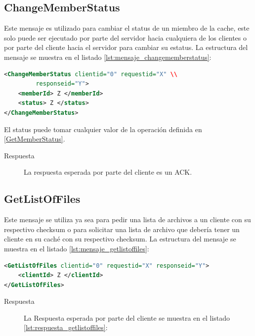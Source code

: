 \subsection{ChangeMemberStatus}
Este mensaje es utilizado para cambiar el status de un miembro de la cache, este solo puede ser ejecutado por parte del servidor hacia cualquiera de los clientes o  por parte del cliente hacia el servidor para cambiar su estatus. La estructura del mensaje se muestra en el listado \ref{lst:mensaje_changememberstatus}:

\begin{lstlisting}[language=XML,caption={Mensaje de ChangeMemberStatus},label={lst:mensaje_changememberstatus}]
<ChangeMemberStatus clientid="0" requestid="X" \\
		 responseid="Y"> 
	<memberId> Z </memberId>
	<status> Z </status>
</ChangeMemberStatus>
\end{lstlisting}


El status puede tomar cualquier valor de la operación definida en \ref{GetMemberStatus}. 


\begin{description}
\item[Respuesta] La respuesta esperada por parte del cliente es un ACK.
\end{description}

\subsection{GetListOfFiles}

Este mensaje se utiliza ya sea para pedir una lista de archivos a un cliente con su respectivo checksum o para solicitar una lista de archivo que debería tener un cliente en su caché con su respectivo checksum. La estructura del mensaje se muestra en el listado \ref{lst:mensaje_getlistoffiles}:

\begin{lstlisting}[language=XML,caption={Mensaje de GetListOfFiles},label={lst:mensaje_getlistoffiles}]
<GetListOfFiles clientid="0" requestid="X" responseid="Y"> 
	<clientId> Z </clientId>
</GetListOfFiles>
\end{lstlisting}

\begin{description}
\item[Respuesta] La Respuesta esperada por parte del cliente se muestra en el listado \ref{lst:respuesta_getlistoffiles}:
\end{description}

